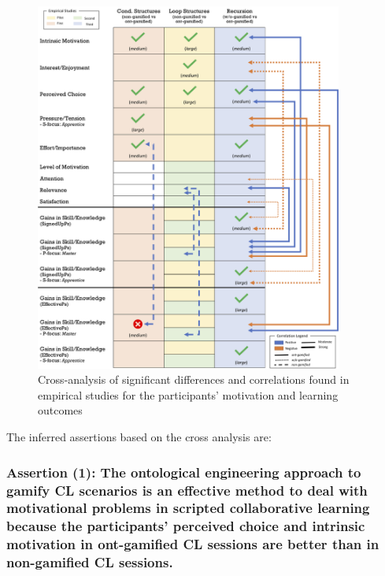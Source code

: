 \begin{figure}[htb]
 \caption{Cross-analysis of significant differences and correlations found in empirical studies for the participants' motivation and learning outcomes}
 \label{fig:cross-analysis}
 \centering
 \includegraphics[width=0.9\textwidth]{images/chap-evaluation/cross-analysis.png}
 \fautor
\end{figure}

The inferred assertions based on the cross analysis are:

\subsubsection*{Assertion (1): The ontological engineering approach to gamify CL scenarios is an effective method to deal with motivational problems in scripted collaborative learning because the participants' perceived choice and intrinsic motivation in ont-gamified CL sessions are better than in non-gamified CL sessions.}

